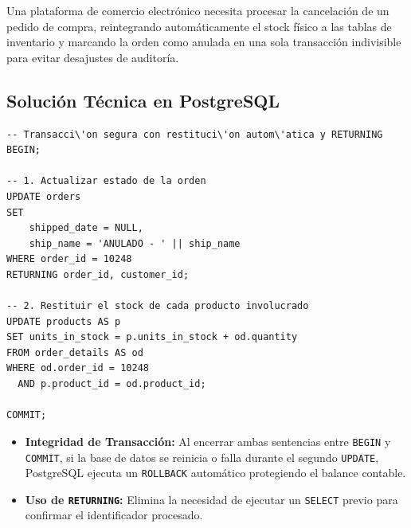 \begin{businessproblem}
Una plataforma de comercio electr\'onico necesita procesar la cancelaci\'on de un pedido de compra, reintegrando autom\'aticamente el stock f\'isico a las tablas de inventario y marcando la orden como anulada en una sola transacci\'on indivisible para evitar desajustes de auditor\'ia.
\end{businessproblem}

\subsection{Soluci\'on T\'ecnica en PostgreSQL}

\begin{lstlisting}[style=sqlstyle, caption={Transacci\'on ACID de anulaci\'on y restituci\'on de inventario}]
-- Transacci\'on segura con restituci\'on autom\'atica y RETURNING
BEGIN;

-- 1. Actualizar estado de la orden
UPDATE orders
SET
    shipped_date = NULL,
    ship_name = 'ANULADO - ' || ship_name
WHERE order_id = 10248
RETURNING order_id, customer_id;

-- 2. Restituir el stock de cada producto involucrado
UPDATE products AS p
SET units_in_stock = p.units_in_stock + od.quantity
FROM order_details AS od
WHERE od.order_id = 10248
  AND p.product_id = od.product_id;

COMMIT;
\end{lstlisting}

\begin{engtip}
\begin{itemize}
    \item \textbf{Integridad de Transacci\'on:} Al encerrar ambas sentencias entre \texttt{BEGIN} y \texttt{COMMIT}, si la base de datos se reinicia o falla durante el segundo \texttt{UPDATE}, PostgreSQL ejecuta un \texttt{ROLLBACK} autom\'atico protegiendo el balance contable.
    \item \textbf{Uso de \texttt{RETURNING}:} Elimina la necesidad de ejecutar un \texttt{SELECT} previo para confirmar el identificador procesado.
\end{itemize}
\end{engtip}
